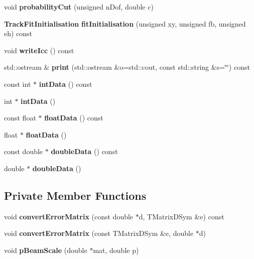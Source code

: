 \begin{DoxyCompactItemize}
\item 
void {\bfseries probabilityCut} (unsigned nDof, double c)\label{classTBTrack_1_1FitConstants_a19530322178881f38211053231b8719c}

\item 
{\bf TrackFitInitialisation} {\bfseries fitInitialisation} (unsigned xy, unsigned fb, unsigned eh) const \label{classTBTrack_1_1FitConstants_a39d3a5bdfce8fe17387e1470d00543b6}

\item 
void {\bfseries writeIcc} () const \label{classTBTrack_1_1FitConstants_ac5738f5f948c0cee82dab1ca7b5b756b}

\item 
std::ostream \& {\bfseries print} (std::ostream \&o=std::cout, const std::string \&s=\char`\"{}\char`\"{}) const \label{classTBTrack_1_1FitConstants_ad62ddbd9b8fd5f827fccabf35691abf1}

\item 
const int $\ast$ {\bfseries intData} () const \label{classTBTrack_1_1FitConstants_a300c624cc611cb716f86dd7692c6f2ab}

\item 
int $\ast$ {\bfseries intData} ()\label{classTBTrack_1_1FitConstants_a40b7f0a0888a062b84b4c0f47e7aa932}

\item 
const float $\ast$ {\bfseries floatData} () const \label{classTBTrack_1_1FitConstants_ae20c4d5c95c45bad29c9b8f364614e78}

\item 
float $\ast$ {\bfseries floatData} ()\label{classTBTrack_1_1FitConstants_abb376a6b05cc1c2bafb24ba44a230348}

\item 
const double $\ast$ {\bfseries doubleData} () const \label{classTBTrack_1_1FitConstants_a05fa985c01f9de23dbffbe275afa0127}

\item 
double $\ast$ {\bfseries doubleData} ()\label{classTBTrack_1_1FitConstants_a53ba2da4d9d0a108988e207f665c88bd}

\end{DoxyCompactItemize}
\subsection*{Private Member Functions}
\begin{DoxyCompactItemize}
\item 
void {\bfseries convertErrorMatrix} (const double $\ast$d, TMatrixDSym \&e) const \label{classTBTrack_1_1FitConstants_a239bf750e8846e198310ccd5dfc27b51}

\item 
void {\bfseries convertErrorMatrix} (const TMatrixDSym \&e, double $\ast$d)\label{classTBTrack_1_1FitConstants_aed80acea11b9312ca325f0032c2aa624}

\item 
void {\bfseries pBeamScale} (double $\ast$mat, double p)\label{classTBTrack_1_1FitConstants_a9bb5f5ac9c07dfb702e48c48a1dce9ea}

\end{DoxyCompactItemize}
